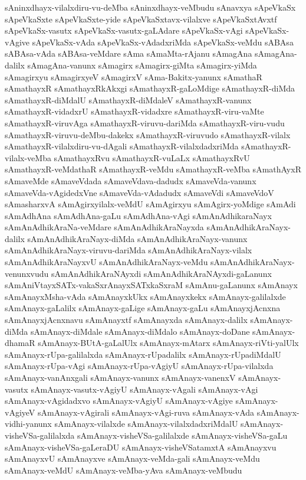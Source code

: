 {sAninxdhayx-vilalxdiru-vu-deMba
sAninxdhayx-veMbudu
sAnavxya
sApeVkaSx
sApeVkaSxte
sApeVkaSxte-yide
sApeVkaSxtavx-vilalxve
sApeVkaSxtAvxtf
sApeVkaSx-vasutx
sApeVkaSx-vasutx-gaLAdare
sApeVkaSx-vAgi
sApeVkaSx-vAgive
sApeVkaSx-vAda
sApeVkaSx-vAdadxriMda
sApeVkaSx-veMdu
sABAsa
sABAsa-vAda
sABAsa-veMdare
sAma
sAmaMta-rAjanu
sAmagAna
sAmagAna-dalilx
sAmagAna-vanunx
sAmagirx
sAmagirx-giMta
sAmagirx-yiMda
sAmagirxyu
sAmagirxyeV
sAmagirxV
sAma-Bakitx-yanunx
sAmathaR
sAmathayxR
sAmathayxRkAkxgi
sAmathayxR-gaLoMdige
sAmathayxR-diMda
sAmathayxR-diMdalU
sAmathayxR-diMdaleV
sAmathayxR-vanunx
sAmathayxR-vidadxrU
sAmathayxR-vidadxre
sAmathayxR-viru-vaMte
sAmathayxR-viruvAga
sAmathayxR-viruvu-dariMda
sAmathayxR-viru-vudu
sAmathayxR-viruvu-deMbu-dakekx
sAmathayxR-viruvudo
sAmathayxR-vilalx
sAmathayxR-vilalxdiru-vu-dAgali
sAmathayxR-vilalxdadxriMda
sAmathayxR-vilalx-veMba
sAmathayxRvu
sAmathayxR-vuLaLx
sAmathayxRvU
sAmathayxR-veMdathaR
sAmathayxR-veMdu
sAmathayxR-veMba
sAmathAyxR
sAmaveMde
sAmaveVdada
sAmaveVdava-dadudx
sAmaveVda-vanunx
sAmaveVda-vAgidedxVne
sAmaveVda-vAdadudx
sAmaveVdi
sAmaveVdoV
sAmasharxvA
sAmAgirxyilalx-veMdU
sAmAgirxyu
sAmAgirx-yoMdige
sAmAdi
sAmAdhAna
sAmAdhAna-gaLu
sAmAdhAna-vAgi
sAmAnAdhikaraNayx
sAmAnAdhikAraNa-veMdare
sAmAnAdhikAraNayxda
sAmAnAdhikAraNayx-dalilx
sAmAnAdhikAraNayx-diMda
sAmAnAdhikAraNayx-vanunx
sAmAnAdhikAraNayx-viruvu-dariMda
sAmAnAdhikAraNayx-vilalx
sAmAnAdhikAraNayxvU
sAmAnAdhikAraNayx-veMdu
sAmAnAdhikAraNayx-venunxvudu
sAmAnAdhikAraNAyxdi
sAmAnAdhikAraNAyxdi-gaLanunx
sAmAniVtayxSATx-vakaSxrAnayxSATxkaSxraM
sAmAnu-gaLanunx
sAmAnayx
sAmAnayxMsha-vAda
sAmAnayxkUkx
sAmAnayxkekx
sAmAnayx-galilalxde
sAmAnayx-gaLalilx
sAmAnayx-gaLige
sAmAnayx-gaLu
sAmAnayxjAcnxna
sAmAnayxjAcnxnavu
sAmAnayxtf
sAmAnayxda
sAmAnayx-dalilx
sAmAnayx-diMda
sAmAnayx-diMdale
sAmAnayx-diMdalo
sAmAnayx-doDane
sAmAnayx-dhamaR
sAmAnayx-BUtA-gaLalUlx
sAmAnayx-mAtarx
sAmAnayx-riVti-yalUlx
sAmAnayx-rUpa-galilalxda
sAmAnayx-rUpadalilx
sAmAnayx-rUpadiMdalU
sAmAnayx-rUpa-vAgi
sAmAnayx-rUpa-vAgiyU
sAmAnayx-rUpa-vilalxda
sAmAnayx-vanAnxgali
sAmAnayx-vanunx
sAmAnayx-vanenxV
sAmAnayx-vasutx
sAmAnayx-vasutx-vAgiyU
sAmAnayx-vAgali
sAmAnayx-vAgi
sAmAnayx-vAgidadxvo
sAmAnayx-vAgiyU
sAmAnayx-vAgiye
sAmAnayx-vAgiyeV
sAmAnayx-vAgirali
sAmAnayx-vAgi-ruva
sAmAnayx-vAda
sAmAnayx-vidhi-yanunx
sAmAnayx-vilalxde
sAmAnayx-vilalxdadxriMdalU
sAmAnayx-visheVSa-galilalxda
sAmAnayx-visheVSa-galilalxde
sAmAnayx-visheVSa-gaLu
sAmAnayx-visheVSa-gaLeraDU
sAmAnayx-visheVSatamxtA
sAmAnayxvu
sAmAnayxvU
sAmAnayxve
sAmAnayx-veMda-gali
sAmAnayx-veMdu
sAmAnayx-veMdU
sAmAnayx-veMba-yAva
sAmAnayx-veMbudu
}
